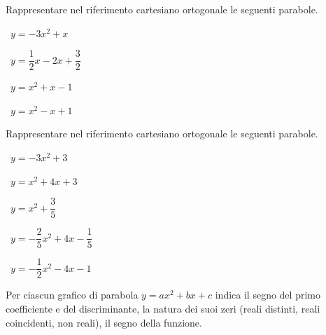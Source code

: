 \begin{esercizio}
 \label{ese:4.7}
Rappresentare nel riferimento cartesiano ortogonale le seguenti parabole.
\vspace{\dy}
\begin{htmulticols}{2}
 \begin{enumeratea}
 \item~\( y=-3x^2+x \)
 \item~\( y=\dfrac 1 2x-2x+\dfrac 3 2 \)
 \item~\( y=x^2+x-1 \)
 \item~\( y=x^2-x+1 \)
 \end{enumeratea}
 \end{htmulticols}
\end{esercizio}

\begin{esercizio}
 \label{ese:4.8}
Rappresentare nel riferimento cartesiano ortogonale le seguenti parabole.
\vspace{\dy}
\begin{htmulticols}{2}
 \begin{enumeratea}
 \item~\( y=-3x^2+3 \)
 \item~\( y=x^2+4x+3 \)
 \item~\( y=x^2+\dfrac 3 5 \)
 \item~\( y=-\dfrac 2 5x^2+4x-\dfrac 1 5 \)
 \item~\( y=-\dfrac 1 2 x^2-4x-1 \)
 \end{enumeratea}
 \end{htmulticols}
\end{esercizio}

\vspace{\dy}
\begin{minipage}{.39 \textwidth}
\begin{esercizio}
 \label{ese:4.9}
Per ciascun grafico di parabola \(y=ax^2+bx+c\) indica il segno del primo 
coefficiente e del discriminante, la natura dei suoi zeri (reali distinti, 
reali coincidenti, non reali), il segno della funzione.
\end{esercizio}
\end{minipage}
\hfill
\begin{minipage}{.59 \textwidth}
\begin{center}
 \scalebox{.7}{\parabole}
\end{center}
\end{minipage}

